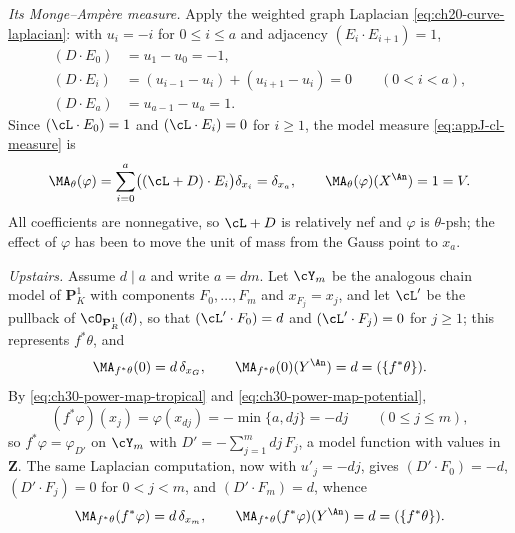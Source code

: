 \begin{example}
\emph{Its Monge--Amp\`ere measure.}  Apply the weighted graph Laplacian
\eqref{eq:ch20-curve-laplacian}: with $u_i=-i$ for $0\leq i\leq a$ and
adjacency $(E_i\cdot E_{i+1})=1$,
\[
\begin{aligned}
 (D\cdot E_0)&=u_1-u_0=-1,\\
 (D\cdot E_i)&=(u_{i-1}-u_i)+(u_{i+1}-u_i)=0\qquad(0<i<a),\\
 (D\cdot E_a)&=u_{a-1}-u_a=1 .
\end{aligned}
\]
Since $(\cL\cdot E_0)=1$ and $(\cL\cdot E_i)=0$ for $i\geq1$, the
model measure \eqref{eq:appJ-cl-measure} is
\begin{equation}
\label{eq:ch30-power-map-ma-down}
 \MA_\theta(\varphi)
 =\sum_{i=0}^a\bigl((\cL+D)\cdot E_i\bigr)\delta_{x_i}
 =\delta_{x_a},
 \qquad
 \MA_\theta(\varphi)(X^{\An})=1=V .
\end{equation}
All coefficients are nonnegative, so $\cL+D$ is relatively nef and
$\varphi$ is $\theta$-psh; the effect of $\varphi$ has been to move
the unit of mass from the Gauss point to $x_a$.

\emph{Upstairs.}  Assume $d\mid a$ and write $a=dm$.  Let $\cY_m$ be
the analogous chain model of $\mathbf P^1_K$ with components
$F_0,\ldots,F_m$ and $x_{F_j}=x_j$, and let $\cL'$ be the pullback of
$\cO_{\mathbf P^1_R}(d)$, so that $(\cL'\cdot F_0)=d$ and
$(\cL'\cdot F_j)=0$ for $j\geq1$; this represents $f^*\theta$, and
\begin{equation}
\label{eq:ch30-power-map-ma-ref}
 \MA_{f^*\theta}(0)=d\,\delta_{x_G},
 \qquad
 \MA_{f^*\theta}(0)(Y^{\An})=d=(\{f^*\theta\}) .
\end{equation}
By \eqref{eq:ch30-power-map-tropical} and
\eqref{eq:ch30-power-map-potential},
\[
 (f^*\varphi)(x_j)=\varphi(x_{dj})=-\min\{a,dj\}=-dj
 \qquad (0\leq j\leq m),
\]
so $f^*\varphi=\varphi_{D'}$ on $\cY_m$ with
$D'=-\sum_{j=1}^m dj\,F_j$, a model function with values in
$\mathbf Z$.  The same Laplacian computation, now with $u'_j=-dj$, gives
$(D'\cdot F_0)=-d$, $(D'\cdot F_j)=0$ for $0<j<m$, and
$(D'\cdot F_m)=d$, whence
\begin{equation}
\label{eq:ch30-power-map-ma-up}
 \MA_{f^*\theta}(f^*\varphi)=d\,\delta_{x_m},
 \qquad
 \MA_{f^*\theta}(f^*\varphi)(Y^{\An})=d=(\{f^*\theta\}) .
\end{equation}


\end{example}
